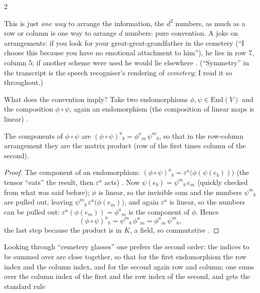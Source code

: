\begin{paracol}{2}
\begin{intuition}\label{int:te-matrix}
This is just \emph{one way} to arrange the information, the $d^2$ numbers, as much as a row or column is one way to arrange $d$ numbers: pure convention. A joke on arrangements: if you look for your great-great-grandfather in the cemetery (``I choose this because you have no emotional attachment to him''), he lies in row 7, column 5; if
another scheme were used he would lie elsewhere . (``Symmetry'' in the transcript is the speech recogniser's rendering of \emph{cemetery}; I read it so throughout.)
\end{intuition}
What does the convention imply? Take two endomorphisms $\phi,\psi\in\mathrm{End}(V)$ and the composition $\phi\circ\psi$, again an endomorphism (the composition of linear maps is linear) .
\begin{proposition}\label{prop:te-matmult}
The components of $\phi\circ\psi$ are $(\phi\circ\psi)^a{}_b=\phi^a{}_m\,\psi^m{}_b$, so that in the row-column arrangement they are the matrix product (row of the first times column of the second).
\end{proposition}
\begin{proof}
The component of an endomorphism: $(\phi\circ\psi)^a{}_b=\varepsilon^a\bigl(\phi(\psi(e_b))\bigr)$ (the tensor ``eats'' the result, then $\varepsilon^a$ acts) .
Now $\psi(e_b)=\psi^m{}_b\,e_m$ (quickly checked from what was said before); $\phi$ is linear, so the invisible sum and the numbers $\psi^m{}_b$ are pulled out, leaving $\psi^m{}_b\,\varepsilon^a\bigl(\phi(e_m)\bigr)$, and again $\varepsilon^a$ is linear, so the numbers can be pulled out: $\varepsilon^a(\phi(e_m))=\phi^a{}_m$ is the component of $\phi$. Hence
\[
  (\phi\circ\psi)^a{}_b=\psi^m{}_b\,\phi^a{}_m=\phi^a{}_m\,\psi^m{}_b,
\]
the last step because the product is in $K$, a field, so commutative .
\end{proof}
Looking through ``cemetery glasses'' one prefers the second order: the indices to be summed over are close together, so that for the first endomorphism the row index and the column index, and for the second again row and column; one sums over the column index of the first and the row index of the second, and gets the standard rule

\end{paracol}
